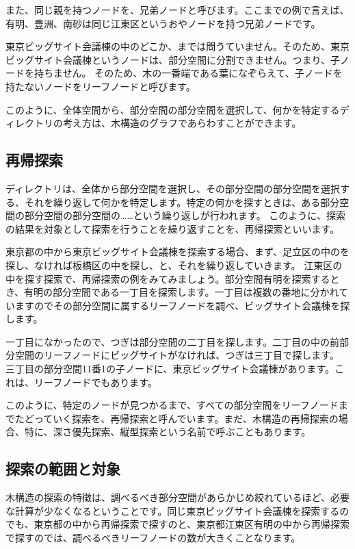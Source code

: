 また、同じ親を持つノードを、兄弟ノードと呼びます。ここまでの例で言えば、有明、豊洲、南砂は同じ江東区というおやノードを持つ兄弟ノードです。

東京ビッグサイト会議棟の中のどこか、までは問うていません。そのため、東京ビッグサイト会議棟というノードは、部分空間に分割できません。つまり、子ノードを持ちません。
そのため、木の一番端である葉になぞらえて、子ノードを持たないノードをリーフノードと呼びます。

このように、全体空間から、部分空間の部分空間を選択して、何かを特定するディレクトリの考え方は、木構造のグラフであらわすことができます。

\subsection{再帰探索}

ディレクトリは、全体から部分空間を選択し、その部分空間の部分空間を選択する、それを繰り返して何かを特定します。特定の何かを探すときは、ある部分空間の部分空間の部分空間の……という繰り返しが行われます。
このように、探索の結果を対象として探索を行うことを繰り返すことを、再帰探索といいます。

東京都の中から東京ビッグサイト会議棟を探索する場合、まず、足立区の中のを探し、なければ板橋区の中を探し、と、それを繰り返していきます。
江東区の中を探す探索で、再帰探索の例をみてみましょう。部分空間有明を探索するとき、有明の部分空間である一丁目を探索します。一丁目は複数の番地に分かれていますのでその部分空間に属するリーフノードを調べ、ビッグサイト会議棟を探します。

一丁目になかったので、つぎは部分空間の二丁目を探します。二丁目の中の前部分空間のリーフノードにビッグサイトがなければ、つぎは三丁目で探します。
三丁目の部分空間11番1の子ノードに、東京ビッグサイト会議棟があります。これは、リーフノードでもあります。

このように、特定のノードが見つかるまで、すべての部分空間をリーフノードまでたどっていく探索を、再帰探索と呼んでいます。まだ、木構造の再帰探索の場合、特に、深さ優先探索、縦型探索という名前で呼ぶこともあります。


\subsection{探索の範囲と対象}

木構造の探索の特徴は、調べるべき部分空間があらかじめ絞れているほど、必要な計算が少なくなるということです。同じ東京ビッグサイト会議棟を探索するのでも、東京都の中から再帰探索で探すのと、東京都江東区有明の中から再帰探索で探すのでは、調べるべきリーフノードの数が大きくことなります。

